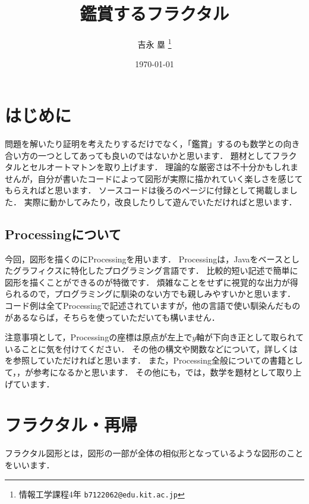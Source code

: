 \documentclass[dvipdfmx]{jsarticle}
\title{鑑賞するフラクタル}
\author{吉永 塁 \thanks{情報工学課程4年 \texttt{b7122062@edu.kit.ac.jp}}}
\date{\today}
\theoremstyle{definition}
\begin{document}
\maketitle{}



\section{はじめに}

問題を解いたり証明を考えたりするだけでなく，「鑑賞」するのも数学との向き合い方の一つとしてあっても良いのではないかと思います．
題材としてフラクタルとセルオートマトンを取り上げます．
理論的な厳密さは不十分かもしれませんが，自分が書いたコードによって図形が実際に描かれていく楽しさを感じてもらえればと思います．
ソースコードは後ろのページに付録として掲載しました．
実際に動かしてみたり，改良したりして遊んでいただければと思います．


\subsection{Processingについて}

今回，図形を描くのにProcessingを用います．
Processingは，Javaをベースとしたグラフィクスに特化したプログラミング言語です．
比較的短い記述で簡単に図形を描くことができるのが特徴です．
煩雑なことをせずに視覚的な出力が得られるので，プログラミングに馴染のない方でも親しみやすいかと思います．
コード例は全てProcessingで記述されていますが，他の言語で使い馴染んだものがあるならば，そちらを使っていただいても構いません．

注意事項として，Processingの座標は原点が左上で$y$軸が下向き正として取られていることに気を付けてください．
その他の構文や関数などについて，詳しくは\cite{pcweb}を参照していただければと思います．
また，Processing全般についての書籍として，\cite{genart}，\cite{cgmediaart}が参考になるかと思います．
その他にも，\cite{mathgen}では，数学を題材として取り上げています．



\section{フラクタル・再帰}

フラクタル図形とは，図形の一部が全体の相似形となっているような図形のことをいいます．
\end{document}
